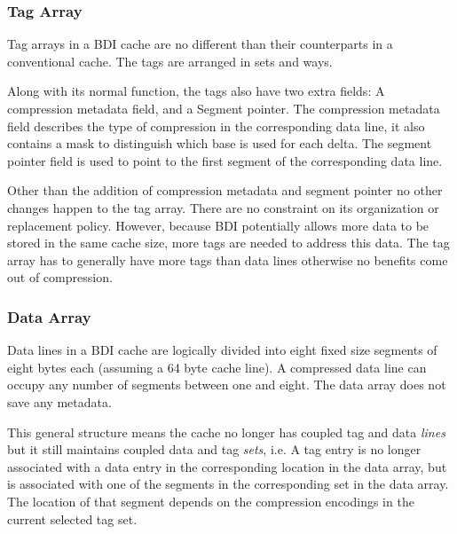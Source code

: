 \subsubsection{Tag Array}
\label{sssec:BDITag}
Tag arrays in a BDI cache are no different than their counterparts in a conventional cache. The tags are arranged in sets and ways.\par
Along with its normal function, the tags also have two extra fields: A compression metadata field, and a Segment pointer. The compression metadata field describes the type of compression in the corresponding data line, it also contains a mask to distinguish which base is used for each delta. The segment pointer field is used to point to the first segment of the corresponding data line.\par
Other than the addition of compression metadata and segment pointer no other changes happen to the tag array. There are no constraint on its organization or replacement policy. However, because BDI potentially allows more data to be stored in the same cache size, more tags are needed to address this data. The tag array has to generally have more tags than data lines otherwise no benefits come out of compression.
\subsubsection{Data Array}
\label{sssec:BDIData}
Data lines in a BDI cache are logically divided into eight fixed size segments of eight bytes each (assuming a 64 byte cache line). A compressed data line can occupy any number of segments between one and eight. The data array does not save any metadata.\par
This general structure means the cache no longer has coupled tag and data \textit{lines} but it still maintains coupled data and tag \textit{sets}, i.e. A tag entry is no longer associated with a data entry in the corresponding location in the data array, but is associated with one of the segments in the corresponding set in the data array. The location of that segment depends on the compression encodings in the current selected tag set.

